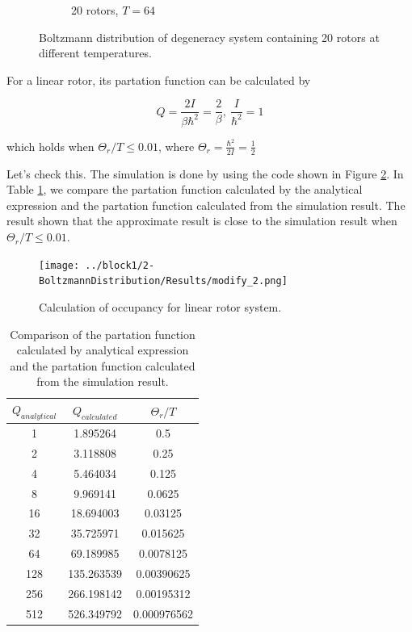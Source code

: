 \documentclass{assignmeownt}
\begin{document}
\begin{figure}
\begin{subfigure}[b]{0.4\textwidth}
      \caption{20 rotors, $T=64$}
  \end{subfigure}
     \caption{Boltzmann distribution of degeneracy system containing 20 rotors at different temperatures.}
     \label{fig:boltzmann_rotor_degeneracy}
\end{figure}


For a linear rotor, its partation function can be calculated by

$$Q=\frac{2I}{\beta\hbar^2}=\frac{2}{\beta},\ \frac{I}{\hbar^2}=1$$

which holds when $\Theta_r/T\leq 0.01$, where $\Theta_r=\frac{\hbar^2}{2I}=\frac{1}{2}$

Let's check this. The simulation is done by using the code shown in Figure \ref{fig:boltzmann_modify2}. In Table \ref{tab:partation function}, we compare the partation function calculated by the analytical expression and the partation function calculated from the simulation result. The result shown that the approximate result is close to the simulation result when $\Theta_r/T\leq 0.01$.

\begin{figure}
  \centering
  \texttt{[image: ../block1/2-BoltzmannDistribution/Results/modify\_2.png]}
  \caption{Calculation of occupancy for linear rotor system.}
  \label{fig:boltzmann_modify2}
\end{figure}

\begin{table}[]
  \centering
  \caption{Comparison of the partation function calculated by analytical expression and the partation function calculated from the simulation result.}
  \begin{tabular}{@{}ccc@{}}
  
  \toprule
  
  $Q_{analytical}$ & $Q_{calculated}$ & ${\Theta_r}/T$ \\ \midrule
  1   & 1.895264   & 0.5         \\
  2   & 3.118808   & 0.25        \\
  4   & 5.464034   & 0.125       \\
  8   & 9.969141   & 0.0625      \\
  16  & 18.694003  & 0.03125     \\
  32  & 35.725971  & 0.015625    \\
  64  & 69.189985  & 0.0078125   \\
  128 & 135.263539 & 0.00390625  \\
  256 & 266.198142 & 0.00195312  \\
  512 & 526.349792 & 0.000976562 \\ \bottomrule
  \end{tabular}\label{tab:partation function}
  \end{table}
\end{document}
